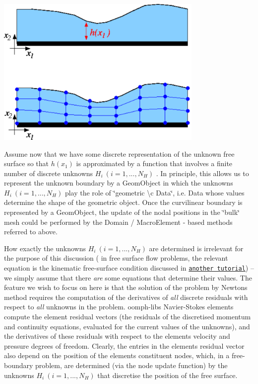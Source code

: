  
\begin{DoxyImage}
\includegraphics[width=0.75\textwidth]{film_sketch}
\end{DoxyImage}


Assume now that we have some discrete representation of the unknown free surface so that $ h(x_1) $ is approximated by a function that involves a finite number of discrete unknowns $ H_i \ (i=1,...,N_H)$ . In principle, this allows us to represent the unknown boundary by a {\ttfamily Geom\+Object} in which the unknowns $ H_i \ (i=1,...,N_H)$ play the role of \char`\"{}geometric
\textbackslash{}c Data\char`\"{}, i.\+e. {\ttfamily Data} whose values determine the shape of the geometric object. Once the curvilinear boundary is represented by a {\ttfamily Geom\+Object}, the update of the nodal positions in the \char`\"{}bulk\char`\"{} mesh could be performed by the {\ttfamily Domain} / {\ttfamily Macro\+Element} -\/ based methods referred to above.

How exactly the unknowns $ H_i \ (i=1,...,N_H)$ are determined is irrelevant for the purpose of this discussion ( in free surface flow problems, the relevant equation is the kinematic free-\/surface condition discussed in \href{../../../navier_stokes/single_layer_free_surface/html/index.html#kinematic_condition_theory}{\tt another tutorial}) -- we simply assume that there {\itshape are} some equations that determine their values. The feature we wish to focus on here is that the solution of the problem by Newton\textquotesingle{}s method requires the computation of the derivatives of {\itshape all} discrete residuals with respect to {\itshape all} unknowns in the problem. {\ttfamily oomph-\/lib\textquotesingle{}s} Navier-\/\+Stokes elements compute the element residual vectors (the residuals of the discretised momentum and continuity equations, evaluated for the current values of the unknowns), and the derivatives of these residuals with respect to the elements\textquotesingle{} velocity and pressure degrees of freedom. Clearly, the entries in the element\textquotesingle{}s residual vector also depend on the position of the element\textquotesingle{}s constituent nodes, which, in a free-\/boundary problem, are determined (via the node update function) by the unknowns $ H_i \ (i=1,...,N_H)$ that discretise the position of the free surface.

